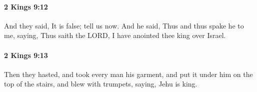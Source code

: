 		\paragraph{2 Kings 9:12} %
			\label{2KINGS-9-12}

			And they said, It is false; tell us now. And he said, Thus and thus spake he to me, saying, Thus saith the LORD, I have anointed thee king over Israel.


		\paragraph{2 Kings 9:13} %
			\label{2KINGS-9-13}

			Then they hasted, and took every man his garment, and put it under him on the top of the stairs, and blew with trumpets, saying, Jehu is king.


